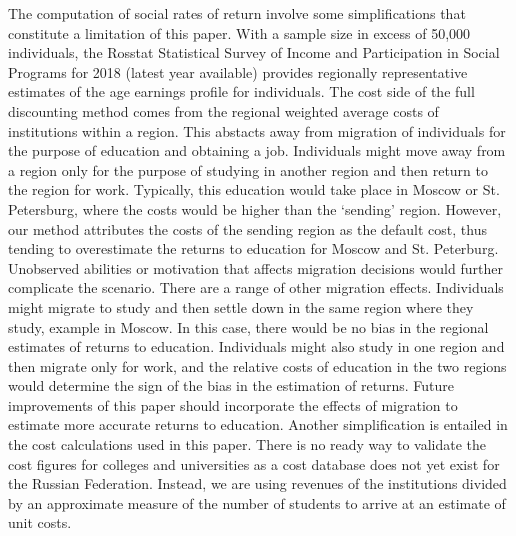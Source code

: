 \documentclass[alpha-refs]{wiley-article-05g}
\begin{document}
The computation of social rates of return involve some simplifications that constitute a limitation of this paper. With a sample size in excess of 50,000 individuals, the Rosstat Statistical Survey of Income and Participation in Social Programs for 2018 (latest year available) provides regionally representative estimates of the age earnings profile for individuals. The cost side of the full discounting method comes from the regional weighted average costs of institutions within a region. This abstacts away from migration of individuals for the purpose of education and obtaining a job. Individuals might move away from a region only for the purpose of studying in another region and then return to the region for work. Typically, this education would take place in Moscow or St. Petersburg, where the costs would be higher than the `sending' region. However, our method attributes the costs of the sending region as the default cost, thus tending to overestimate the returns to education for Moscow and St. Peterburg. Unobserved abilities or motivation that affects migration decisions would further complicate the scenario. There are a range of other migration effects. Individuals might migrate to study and then settle down in the same region where they study, example in Moscow. In this case, there would be no bias in the regional estimates of returns to education. Individuals might also study in one region and then migrate only for work, and the relative costs of education in the two regions would determine the sign of the bias in the estimation of returns.  Future improvements of this paper should incorporate the effects of migration to estimate more accurate returns to education. 
Another simplification is entailed in the cost calculations used in this paper. There is no ready way to validate the cost figures for colleges and universities as a cost database does not yet exist for the Russian Federation. Instead, we are using revenues of the institutions divided by an approximate measure of the number of students to arrive at an estimate of unit costs. 

\vspace{-0.5em}
\end{document}
